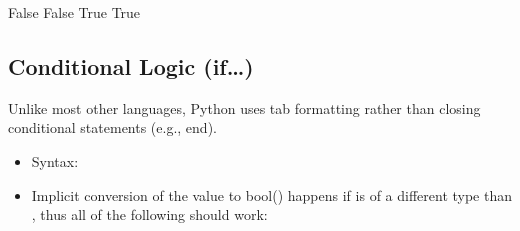 \documentclass[letterpaper,10pt,english]{sphinxmanual}
\begin{document}
\begin{sphinxVerbatim}[commandchars=\\\{\}]
  
  
  

  
  
  
\end{sphinxVerbatim}

\begin{sphinxVerbatim}[commandchars=\\\{\}]
False
False
True
True
\end{sphinxVerbatim}


\subsection{Conditional Logic (if…)}
\label{\detokenize{content/Introduction_to_Programming:conditional-logic-if}}
Unlike most other languages, Python uses tab formatting rather than closing conditional statements (e.g., end).
\begin{itemize}
\item {} 
Syntax:

\end{itemize}

\begin{sphinxVerbatim}[commandchars=\\\{\}]
  
     
\end{sphinxVerbatim}
\begin{itemize}
\item {} 
Implicit conversion of the value to bool() happens if  is of a different type than , thus all of the following should work:

\end{itemize}

\begin{sphinxVerbatim}[commandchars=\\\{\}]
 
 
     
\end{sphinxVerbatim}
\end{document}
